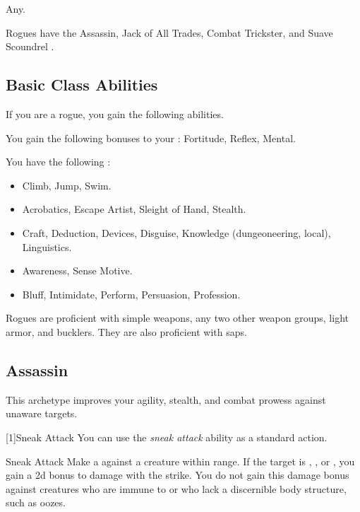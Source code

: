      Any.

     Rogues have the Assassin, Jack of All Trades, Combat Trickster, and Suave Scoundrel .

    \subsection{Basic Class Abilities}
        If you are a rogue, you gain the following abilities.

        You gain the following bonuses to your :  Fortitude,  Reflex,  Mental.

        You have the following :
        \begin{itemize}
            \item {} Climb, Jump, Swim.
            \item {} Acrobatics, Escape Artist, Sleight of Hand, Stealth.
            \item {} Craft, Deduction, Devices, Disguise, Knowledge (dungeoneering, local), Linguistics.
            \item {} Awareness, Sense Motive.
            \item {} Bluff, Intimidate, Perform, Persuasion, Profession.
        \end{itemize}

        Rogues are proficient with simple weapons, any two other weapon groups, light armor, and bucklers.
        They are also proficient with saps.

    \subsection{Assassin}
        This archetype improves your agility, stealth, and combat prowess against unaware targets.

        [1]{Sneak Attack} You can use the \textit{sneak attack} ability as a standard action.
        \begin{freeability}{Sneak Attack}
            Make a  against a creature within \rngclose range.
            If the target is \unaware, , or , you gain a \plus2d bonus to damage with the strike.
            You do not gain this damage bonus against creatures who are immune to  or who lack a discernible body structure, such as oozes.
        \end{freeability}

